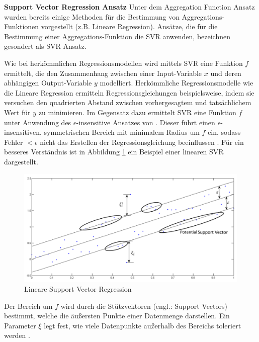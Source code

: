 \textbf{Support Vector Regression Ansatz}
Unter dem Aggregation Function Ansatz wurden bereits einige Methoden für die Bestimmung von Aggregations-Funktionen vorgestellt (z.B. Lineare Regression).
Ansätze, die für die Bestimmung einer Aggregations-Funktion die \ac{SVR} \cite[S. 155ff.]{drucker:inproceedings} anwenden, bezeichnen \textcite[S. 865]{adomavicius:4:inbook} gesondert als \ac{SVR} Ansatz.

Wie bei herkömmlichen Regressionsmodellen wird mittels \ac{SVR} eine Funktion $f$ ermittelt, die den Zusammenhang zwischen einer Input-Variable $x$ und deren abhängigen Output-Variable $y$ modelliert.
Herkömmliche Regressionsmodelle wie die Lineare Regression ermitteln Regressionsgleichungen beispielsweise, indem sie versuchen den quadrierten Abstand zwischen vorhergesagtem und tatsächlichem Wert für $y$ zu minimieren.
Im Gegensatz dazu ermittelt \ac{SVR} eine Funktion $f$ unter Anwendung des $\epsilon$-insensitive Ansatzes von \textcite[S. 181]{vapnik:book} \cite[S. 67]{awad:inbook}.
Dieser führt einen $\epsilon$-insensitiven, symmetrischen Bereich mit minimalem Radius um $f$ ein, sodass Fehler $< \epsilon$ nicht das Erstellen der Regressionsgleichung beeinflussen \cite[S. 67]{awad:inbook}.
Für ein besseres Verständnis ist in Abbildung \ref{fig:optimierung:loesungen:abb3} ein Beispiel einer linearen \ac{SVR} dargestellt.

\begin{figure}
    \centering
	\includegraphics[width=1.0\textwidth]{gfx/svr.png}
	\caption[Lineare Support Vector Regression]{Lineare Support Vector Regression \cite[S. 68]{awad:inbook}}
	\label{fig:optimierung:loesungen:abb3}
\end{figure}

Der Bereich um $f$ wird durch die Stützvektoren (engl.: Support Vectors) bestimmt, welche die äußersten Punkte einer Datenmenge darstellen.
Ein Parameter $\xi$ legt fest, wie viele Datenpunkte außerhalb des Bereichs toleriert werden \cite[S. 70]{awad:inbook}.

